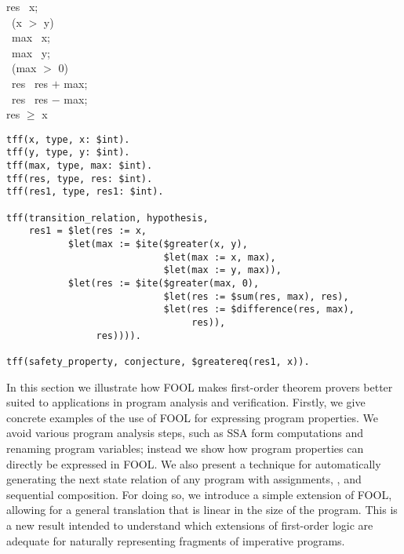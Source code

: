 \begin{figure*}[b]
  \vspace{-1em}
  \begin{center}
    \parbox{0cm}{
      \begin{tabbing}
        res \ass\ x;\\
        \IF\ (x $>$ y) \\\inc
        \THEN\ max \ass\ x;\\
        \ELSE\ max \ass\ y;\\\dec
        \IF\ (max $>$ 0) \\\inc
        \THEN\ res \ass\ res $+$ max;\\
        \ELSE\ res \ass\ res $-$ max;\\[.5em]\dec
         res $\geq$ x
      \end{tabbing}
    }
  \end{center}
  \vspace{-2em}
  \caption{Sequence of conditionals.\label{fig:seqITE}}
\end{figure*}

\begin{figure*}[tb]
{\small
\begin{lstlisting}[language=tptp]
tff(x, type, x: $int).
tff(y, type, y: $int).
tff(max, type, max: $int).
tff(res, type, res: $int).
tff(res1, type, res1: $int).

tff(transition_relation, hypothesis,
    res1 = $let(res := x,
           $let(max := $ite($greater(x, y),
                            $let(max := x, max),
                            $let(max := y, max)),
           $let(res := $ite($greater(max, 0),
                            $let(res := $sum(res, max), res),
                            $let(res := $difference(res, max),
                                 res)),
                res)))).

tff(safety_property, conjecture, $greatereq(res1, x)).
\end{lstlisting}
\caption{Representation of the partial correctness statement of the code on Figure~\ref{fig:seqITE} in Vampire\label{fig:VampireITE}.}
}
\end{figure*}

In this section we illustrate how FOOL makes first-order theorem
provers better suited to applications in program analysis and
verification.
Firstly,  we give concrete examples of the use of FOOL for
expressing program properties. We avoid various
program analysis steps, such as SSA form computations and renaming
program variables; instead we show how program properties can directly
be expressed in FOOL.
 We also present a technique for
automatically generating the next state relation of any program with
assignments, \ITE, and sequential composition.
For doing so,  we introduce a simple extension of FOOL,
allowing for a general translation that is linear in the size of the
program.
This is a new result intended to understand which extensions of
first-order logic are adequate for naturally representing fragments of
imperative programs.

